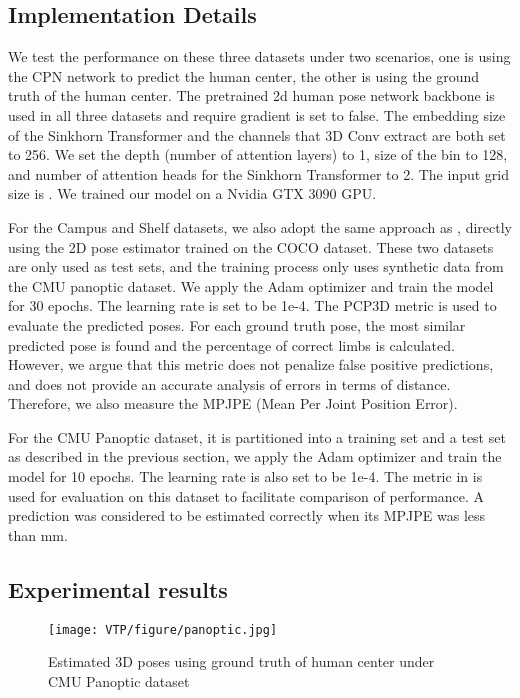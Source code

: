 \documentclass[lettersize,journal]{IEEEtran}
\begin{document}
\subsection{Implementation Details}

\par We test the performance on these three datasets under two scenarios, one is using the CPN network to predict the human center, the other is using the ground truth of the human center. The pretrained 2d human pose network backbone is used in all three datasets and require gradient is set to false. The embedding size of the Sinkhorn Transformer and the channels that 3D Conv extract are both set to 256. We set the depth (number of attention layers) to 1, size of the bin to 128, and number of attention heads for the Sinkhorn Transformer to 2. The input grid size is . We trained our model on a Nvidia GTX 3090 GPU.
\par For the Campus and Shelf datasets, we also adopt the same approach as \cite{tu2020voxelpose}, directly using the 2D pose estimator trained on the COCO dataset. These two datasets are only used as test sets, and the training process only uses synthetic data from the CMU panoptic dataset. We apply the Adam optimizer and train the model for 30 epochs. The learning rate is set to be 1e-4. The PCP3D metric is used to evaluate the predicted poses. For each ground truth pose, the most similar predicted pose is found and the percentage of correct limbs is calculated. However, we argue that this metric does not penalize false positive predictions, and does not provide an accurate analysis of errors in terms of distance. Therefore, we also measure the MPJPE (Mean Per Joint Position Error).

\par For the CMU Panoptic dataset, it is partitioned into a training set and a test set as described in the previous section, we apply the Adam optimizer and train the model for 10 epochs. The learning rate is also set to be 1e-4. The  metric in \cite{tu2020voxelpose} is used for evaluation on this dataset to facilitate comparison of performance. A prediction was considered to be estimated correctly when its MPJPE was less than  mm.

\subsection{Experimental results}

\begin{figure*}[!htb]
 
\texttt{[image: VTP/figure/panoptic.jpg]}
  \caption{Estimated 3D poses using ground truth of human center under CMU Panoptic dataset}
  \label{fig:result_panoptic}
\end{figure*}
\end{document}
